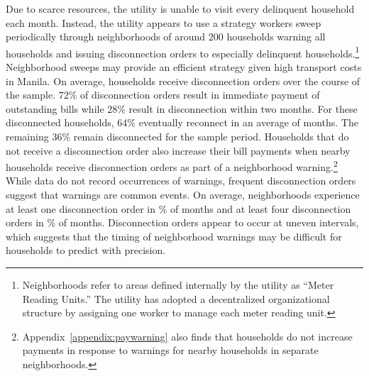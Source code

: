 \documentclass[12pt,table]{article}
\begin{document}
Due to scarce resources, the utility is unable to visit every delinquent household each month.  Instead, the utility appears to use a strategy workers sweep periodically through neighborhoods of around 200 households warning all households and issuing disconnection orders to especially delinquent households.\footnote{Neighborhoods refer to areas defined internally by the utility as ``Meter Reading Units.''  The utility has adopted a decentralized organizational structure by assigning one worker to manage each meter reading unit.}  Neighborhood sweeps may provide an efficient strategy given high transport costs in Manila.  On average, households receive disconnection orders over the course of the sample.  72\% of disconnection orders result in immediate payment of outstanding bills while 28\% result in disconnection within two months.  For these disconnected households, 64\% eventually reconnect in an average of months.  The remaining 36\% remain disconnected for the sample period.   Households that do not receive a disconnection order also increase their bill payments when nearby households receive disconnection orders as part of a neighborhood warning.\footnote{Appendix~\ref{appendix:paywarning} also finds that households do not increase payments in response to warnings for nearby households in separate neighborhoods.}  While data do not record occurrences of warnings, frequent disconnection orders suggest that warnings are common events.  On average, neighborhoods experience at least one disconnection order in \unskip\% of months and at least four disconnection orders in \unskip\% of months.  Disconnection orders appear to occur at uneven intervals, which suggests that the timing of neighborhood warnings may be difficult for households to predict with precision.






\end{document}
